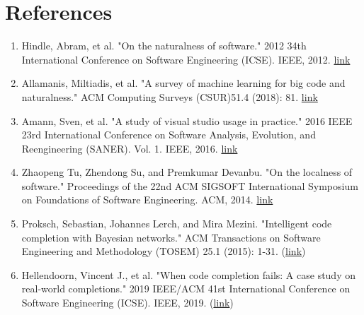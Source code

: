 \section{References}
\begin{enumerate}
	\item Hindle, Abram, et al. "On the naturalness of software." 2012 34th International Conference on Software Engineering (ICSE). IEEE, 2012. \href{http://citeseerx.ist.psu.edu/viewdoc/download?doi=10.1.1.221.1261&rep=rep1&type=pdf}{link}
	\item Allamanis, Miltiadis, et al. "A survey of machine learning for big code and naturalness." ACM Computing Surveys (CSUR)51.4 (2018): 81. \href{https://arxiv.org/pdf/1709.06182.pdf}{link}
	\item Amann, Sven, et al. "A study of visual studio usage in practice." 2016 IEEE 23rd International Conference on Software Analysis, Evolution, and Reengineering (SANER). Vol. 1. IEEE, 2016. \href{https://sarahnadi.org/resources/pubs/Amann_SANER16.pdf}{link}
	\item Zhaopeng Tu, Zhendong Su, and Premkumar Devanbu. "On the localness of software." Proceedings of the 22nd ACM SIGSOFT International Symposium on Foundations of Software Engineering. ACM, 2014. \href{http://zptu.net/papers/fse2014_localness.pdf}{link}
	\item Proksch, Sebastian, Johannes Lerch, and Mira Mezini. "Intelligent code completion with Bayesian networks." ACM Transactions on Software Engineering and Methodology (TOSEM) 25.1 (2015): 1-31. (\href{https://ieeexplore.ieee.org/stamp/stamp.jsp?arnumber=8812116}{link})
	\item Hellendoorn, Vincent J., et al. "When code completion fails: A case study on real-world completions." 2019 IEEE/ACM 41st International Conference on Software Engineering (ICSE). IEEE, 2019. (\href{https://dl.acm.org/doi/pdf/10.1145/2744200}{link})
\end{enumerate}